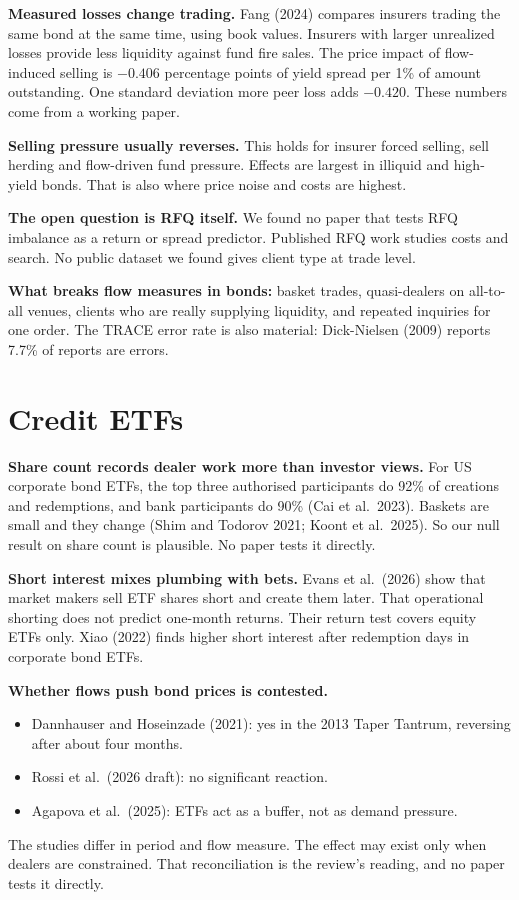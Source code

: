 \documentclass[11pt]{article}
\begin{document}
\textbf{Measured losses change trading.} Fang (2024) compares insurers trading the same bond at the same time, using book values. Insurers with larger unrealized losses provide less liquidity against fund fire sales. The price impact of flow-induced selling is $-0.406$ percentage points of yield spread per 1\% of amount outstanding. One standard deviation more peer loss adds $-0.420$. These numbers come from a working paper.

\textbf{Selling pressure usually reverses.} This holds for insurer forced selling, sell herding and flow-driven fund pressure. Effects are largest in illiquid and high-yield bonds. That is also where price noise and costs are highest.

\textbf{The open question is RFQ itself.} We found no paper that tests RFQ imbalance as a return or spread predictor. Published RFQ work studies costs and search. No public dataset we found gives client type at trade level.

\textbf{What breaks flow measures in bonds:} basket trades, quasi-dealers on all-to-all venues, clients who are really supplying liquidity, and repeated inquiries for one order. The TRACE error rate is also material: Dick-Nielsen (2009) reports 7.7\% of reports are errors.

\section{Credit ETFs}
\textbf{Share count records dealer work more than investor views.} For US corporate bond ETFs, the top three authorised participants do 92\% of creations and redemptions, and bank participants do 90\% (Cai et al.\ 2023). Baskets are small and they change (Shim and Todorov 2021; Koont et al.\ 2025). So our null result on share count is plausible. No paper tests it directly.

\textbf{Short interest mixes plumbing with bets.} Evans et al.\ (2026) show that market makers sell ETF shares short and create them later. That operational shorting does not predict one-month returns. Their return test covers equity ETFs only. Xiao (2022) finds higher short interest after redemption days in corporate bond ETFs.

\textbf{Whether flows push bond prices is contested.}
\begin{itemize}
\item Dannhauser and Hoseinzade (2021): yes in the 2013 Taper Tantrum, reversing after about four months.
\item Rossi et al.\ (2026 draft): no significant reaction.
\item Agapova et al.\ (2025): ETFs act as a buffer, not as demand pressure.
\end{itemize}
The studies differ in period and flow measure. The effect may exist only when dealers are constrained. That reconciliation is the review's reading, and no paper tests it directly.
\end{document}
